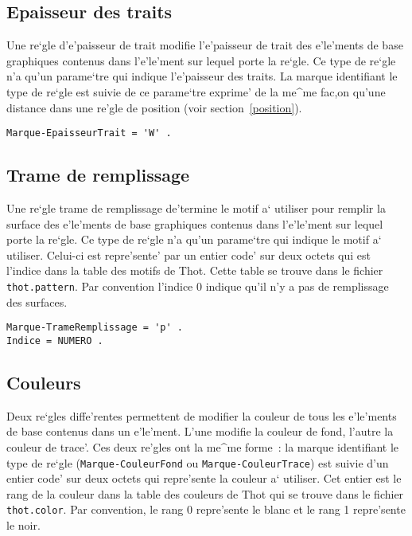 \subsection{Epaisseur des traits}

Une re`gle d'e'paisseur de trait modifie l'e'paisseur de trait des e'le'ments
de base graphiques contenus dans l'e'le'ment sur lequel porte la re`gle.
Ce type de re`gle n'a qu'un parame`tre qui indique l'e'paisseur des traits.
La marque identifiant le type de re`gle est suivie de ce parame`tre
exprime' de la me^me fac,on qu'une distance dans une re'gle de position
(voir section~\ref{position}).

\begin{verbatim}
Marque-EpaisseurTrait = 'W' .
\end{verbatim}

\subsection{Trame de remplissage}

Une re`gle trame de remplissage de'termine le motif a` utiliser pour remplir
la surface des e'le'ments de base graphiques contenus dans l'e'le'ment sur
lequel porte la re`gle. Ce type de re`gle n'a qu'un parame`tre qui indique
le motif a` utiliser. Celui-ci est repre'sente' par un entier code' sur deux
octets qui est l'indice dans la table des motifs de Thot. Cette table
se trouve dans le fichier {\tt thot.pattern}.
Par convention l'indice 0 indique qu'il n'y a pas de remplissage des surfaces.

\begin{verbatim}
Marque-TrameRemplissage = 'p' .
Indice = NUMERO .
\end{verbatim}

\subsection{Couleurs}

Deux re`gles diffe'rentes permettent de modifier la couleur de tous les
e'le'ments de base contenus dans un e'le'ment. L'une modifie la couleur de
fond, l'autre la couleur de trace'. Ces deux re'gles ont la me^me forme~:
la marque identifiant le type de re`gle ({\tt Marque-CouleurFond} ou
{\tt Marque-CouleurTrace}) est suivie d'un entier code' sur deux octets
qui repre'sente la couleur a` utiliser. Cet entier est le rang de la
couleur dans la table des couleurs de Thot qui se trouve dans le fichier
{\tt thot.color}.
Par convention, le rang 0 repre'sente le blanc et le rang 1 repre'sente
le noir.

